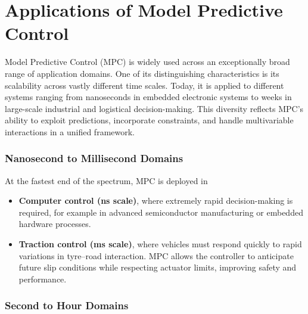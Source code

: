 \section{Applications of Model Predictive Control}

Model Predictive Control (MPC) is widely used across an exceptionally broad
range of application domains. One of its distinguishing characteristics is
its scalability across vastly different time scales. Today, it is applied to different systems ranging from nanoseconds in embedded electronic systems to weeks in large-scale industrial and logistical decision-making. This diversity reflects MPC’s ability to exploit predictions, incorporate  constraints, and handle multivariable interactions in a unified framework.

\subsubsection*{Nanosecond to Millisecond Domains}

At the fastest end of the spectrum, MPC is deployed in
\begin{itemize}
	\item \textbf{Computer control (ns scale)}, where extremely rapid
	decision-making is required, for example in advanced semiconductor
	manufacturing or embedded hardware processes.
	
	\item \textbf{Traction control (ms scale)}, where vehicles must respond
	quickly to rapid variations in tyre–road interaction. MPC allows the
	controller to anticipate future slip conditions while respecting actuator
	limits, improving safety and performance.
\end{itemize}

\subsubsection*{Second to Hour Domains}

